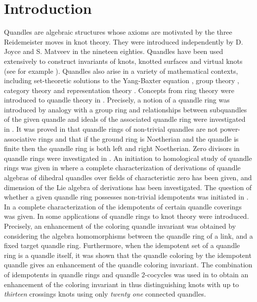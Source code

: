 \documentclass[12pt]{amsart}
\theoremstyle{definition}
\theoremstyle{remark}
\begin{document}
\section{Introduction}
Quandles are algebraic structures whose axioms are motivated by the three Reidemeister moves in knot theory.  They were introduced independently by D. Joyce \cite{Joyce} and S. Matveev \cite{Matveev} in the nineteen eighties.  Quandles have been used extensively to construct invariants of knots,  knotted surfaces and virtual knots (see for example \cite{EN, CJKLS, CES, CEGS}).  Quandles also arise in a variety of mathematical contexts, including set-theoretic solutions to the Yang-Baxter equation \cite{BES}, group theory \cite{EMR, BDS, BNS}, category theory \cite{CCES} and representation theory \cite{EM, ESZ}.  Concepts from ring theory were introduced to quandle theory in \cite{BPS2}.  Precisely, a notion of a quandle ring was introduced by analogy with a group ring  and relationships between subquandles of the given quandle and ideals of the associated quandle ring were investigated in \cite{BPS2}.  It was proved in \cite{EFT} that quandle rings of non-trivial quandles are not power-associative rings and that if the ground ring is Noetherian and the quandle is finite then the quandle ring is both left and right Noetherian.  Zero divisors in quandle rings were investigated in \cite{BPS1}.  An initiation to homological study of quandle rings was given in \cite{EMSZ} where a complete characterization of derivations of quandle algebras of dihedral quandles over fields of characteristic zero has been given, and dimension of the Lie algebra of derivations has been investigated.   The question of whether a given quandle ring possesses non-trivial idempotents was initiated in  \cite{BPS1}. In \cite{ENSS}  a complete characterization of the idempotents of certain quandle coverings was given.  In \cite{ENS} some applications of quandle rings to knot theory were introduced.  Precisely, an enhancement of the coloring quandle invariant was obtained by considering the algebra homomorphisms between the quandle ring of a link, and a fixed target quandle ring.  Furthermore, when the idempotent set of a quandle ring is a quandle itself, it was shown that the quandle coloring by the idempotent quandle gives an enhancement of the quandle coloring invariant.  The combination of idempotents in quandle rings and quandle $2$-cocycles was used in \cite{ES} to obtain an enhancement of the coloring invariant in \cite{CESY} thus distinguishing knots with up to \emph{thirteen} crossings knots using only \emph{twenty one} connected quandles.
 
\end{document}
